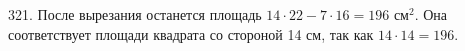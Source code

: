 321. После вырезания останется площадь $14\cdot22-7\cdot16=196\text{ см}^2.$ Она соответствует площади квадрата со стороной 14 см, так как $14\cdot 14=196.$\\
